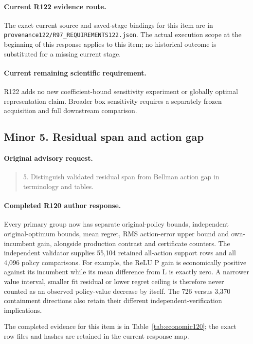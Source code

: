 \paragraph{Current R122 evidence route.}
The exact current source and saved-stage bindings for this item are in \nolinkurl{provenance122/R97_REQUIREMENTS122.json}. The actual execution scope at the beginning of this response applies to this item; no historical outcome is substituted for a missing current stage.
\paragraph{Current remaining scientific requirement.}
R122 adds no new coefficient-bound sensitivity experiment or globally optimal representation claim. Broader box sensitivity requires a separately frozen acquisition and full downstream comparison.

\subsection{Minor 5. Residual span and action gap}
\label{response122:minor-5}

\paragraph{Original advisory request.}
\begin{quote}
5. Distinguish validated residual span from Bellman action gap in terminology and tables.
\end{quote}

\paragraph{Completed R120 author response.}
Every primary group now has separate original-policy bounds, independent original-optimum bounds, mean regret, RMS action-error upper bound and own-incumbent gain, alongside production contrast and certificate counters. The independent validator supplies 55,104 retained all-action support rows and all 4,096 policy comparisons. For example, the ReLU P gain is economically positive against its incumbent while its mean difference from L is exactly zero. A narrower value interval, smaller fit residual or lower regret ceiling is therefore never counted as an observed policy-value decrease by itself. The 726 versus 3,370 containment directions also retain their different independent-verification implications.

The completed evidence for this item is in Table~\ref{tab:economic120}; the exact row files and hashes are retained in the current response map.

